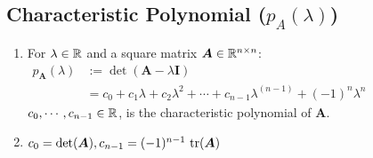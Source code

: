 \subsection{Characteristic Polynomial ($p_A(\lambda)$)}

\begin{enumerate}
    \item
    \begin{definition}
        For $\lambda \in \mathbb{R}$ and a square matrix $\bm{A} \in \mathbb{R}^{n\times n}$:
        \\
        $
            \begin{aligned}
                p_{\bm{A}}(\lambda ) &:= \det(\bm{A} - \lambda \bm{I}) \\
                &= c_0 + c_1\lambda  + c_2\lambda  ^2 + \cdots + c_{n-1}\lambda ^{( n-1)} + (-1)^n\lambda^  n
            \end{aligned}
        $
        \\
        $c_0, \cdots , c_{n-1} \in \mathbb{R}$, is the characteristic polynomial of $\bm{A}$.
    \end{definition}

    \item $c_0 = \det(\bm{A}), c_{n-1} = (-1)^{n-1}\ \text{tr}(\bm{A})$
\end{enumerate}









